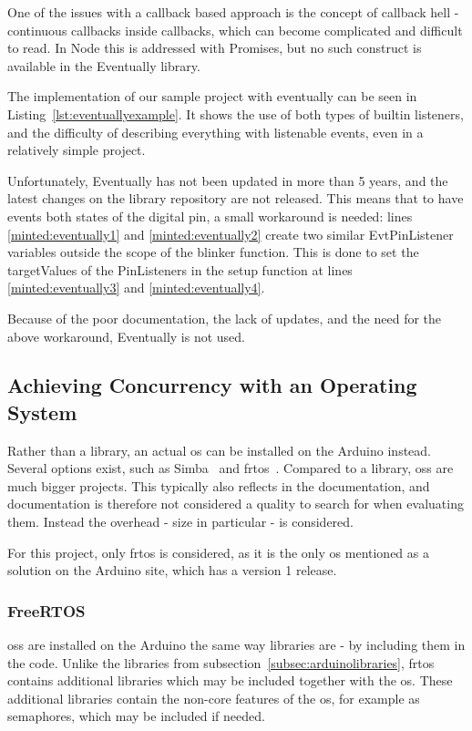 One of the issues with a callback based approach is the concept of callback hell - continuous callbacks inside callbacks, which can become complicated and difficult to read. In Node this is addressed with Promises, but no such construct is available in the Eventually library.

The implementation of our sample project with eventually can be seen in Listing~\ref{lst:eventuallyexample}. It shows the use of both types of builtin listeners, and the difficulty of describing everything with listenable events, even in a relatively simple project.

Unfortunately, Eventually has not been updated in more than 5 years, and the latest changes on the library repository are not released. This means that to have events both states of the digital pin, a small workaround is needed: lines \ref{minted:eventually1} and \ref{minted:eventually2} create two similar EvtPinListener variables outside the scope of the blinker function. This is done to set the targetValues of the PinListeners in the setup function at lines \ref{minted:eventually3} and \ref{minted:eventually4}.

Because of the poor documentation, the lack of updates, and the need for the above workaround, Eventually is not used.


\subsection{Achieving Concurrency with an Operating System}\label{subsec:arduinoos}
Rather than a library, an actual \gls{os} can be installed on the Arduino instead. Several options exist, such as Simba~\cite{SimbaOS} and \gls{frtos}~\cite{AboutRTOS}. Compared to a library, \glspl{os} are much bigger projects. This typically also reflects in the documentation, and documentation is therefore not considered a quality to search for when evaluating them. Instead the overhead - size in particular - is considered.

For this project, only \gls{frtos} is considered, as it is the only \gls{os} mentioned as a solution on the Arduino site, which has a version 1 release.


\subsubsection{FreeRTOS}
\glspl{os} are installed on the Arduino the same way libraries are - by including them in the code. Unlike the libraries from subsection~\ref{subsec:arduinolibraries}, \gls{frtos} contains additional libraries which may be included together with the \gls{os}. These additional libraries contain the non-core features of the \gls{os}, for example as semaphores, which may be included if needed.


